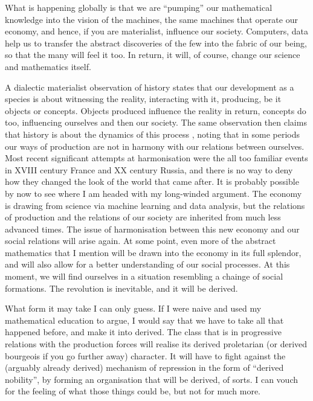\documentclass{article}
\begin{document}
What is happening globally is that we are “pumping” our mathematical knowledge into the vision of the machines, the same machines that operate our economy, and hence, if you are materialist, influence our society. Computers, data help us to transfer the abstract discoveries of the few into the fabric of our being, so that the many will feel it too. In return, it will, of course, change our science and mathematics itself.

A dialectic materialist observation of history states that our development as a species is about witnessing the reality, interacting with it, producing, be it objects or concepts. Objects produced influence the reality in return, concepts do too, influencing ourselves and then our society. The same observation then claims that history is about the dynamics of this process  \cite{MARX,MARXENGCPE}, noting that in some periods our ways of production are not in harmony with our relations between ourselves. Most recent significant attempts at harmonisation were the all too familiar events in XVIII century France and XX century Russia, and there is no way to deny how they changed the look of the world that came after. It is probably possible by now to see where I am headed with my long-winded argument. The economy is drawing from science via machine learning and data analysis,
but the relations of production and the relations of our society are inherited from much less advanced times.
The issue of harmonisation between this new economy and our social relations will arise again. At some point, even more of the abstract mathematics that I mention will be drawn into the economy in its full splendor, and will also allow for a better understanding of our social processes. At this moment, we will find ourselves
in a situation resembling a chainge of social formations.
The revolution is inevitable, and it will be derived.

What form it may take I can only guess. If I were naive and used my mathematical education to argue, I would say that we have to take all that happened before, and make it into derived. The class that is in progressive relations with the production forces will realise its derived proletarian (or derived bourgeois if you go further away) character. It will have to fight against the (arguably already derived) mechanism of repression in the form of ``derived nobility'', by forming an organisation that will be derived, of sorts. I can vouch for the feeling of what those things could be, but not for much more.
\end{document}
